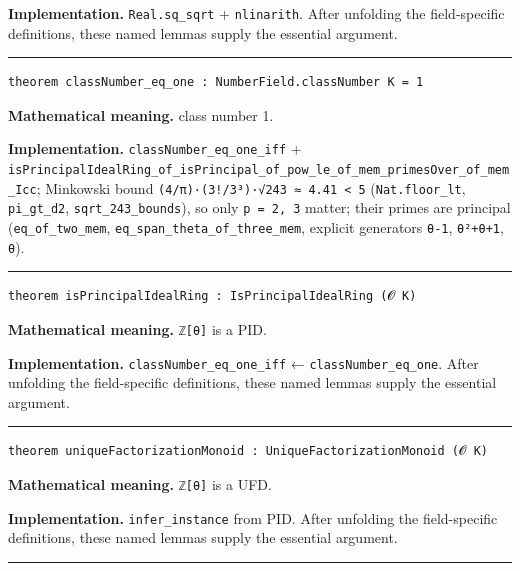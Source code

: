 \documentclass[UTF8,a4paper,11pt,fontset=fandol]{ctexart}
\theoremstyle{definition}
\newcommand{\statementsep}{\par\medskip\hrule\medskip}
\begin{document}
\noindent\textbf{Implementation.} \texttt{Real.\allowbreak{}sq\_\allowbreak{}sqrt} + \texttt{nlinarith}. After unfolding the field-specific definitions, these named lemmas supply the essential argument.\par
\statementsep
\begin{verbatim}
theorem classNumber_eq_one : NumberField.classNumber K = 1
\end{verbatim}
\noindent\textbf{Mathematical meaning.} class number 1.\par
\noindent\textbf{Implementation.} \texttt{classNumber\_\allowbreak{}eq\_\allowbreak{}one\_\allowbreak{}iff} + \texttt{isPrincipalIdealRing\_\allowbreak{}of\_\allowbreak{}isPrincipal\_\allowbreak{}of\_\allowbreak{}pow\_\allowbreak{}le\_\allowbreak{}of\_\allowbreak{}mem\_\allowbreak{}primesOver\_\allowbreak{}of\_\allowbreak{}mem\_\allowbreak{}Icc}; Minkowski bound \texttt{(4/\allowbreak{}π)·(3!/\allowbreak{}3³)·√243 ≈ 4.\allowbreak{}41 < 5} (\texttt{Nat.\allowbreak{}floor\_\allowbreak{}lt}, \texttt{pi\_\allowbreak{}gt\_\allowbreak{}d2}, \texttt{sqrt\_\allowbreak{}243\_\allowbreak{}bounds}), so only \texttt{p = 2, 3} matter; their primes are principal (\texttt{eq\_\allowbreak{}of\_\allowbreak{}two\_\allowbreak{}mem}, \texttt{eq\_\allowbreak{}span\_\allowbreak{}theta\_\allowbreak{}of\_\allowbreak{}three\_\allowbreak{}mem}, explicit generators \texttt{θ-1}, \texttt{θ²+θ+1}, \texttt{θ}).\par
\statementsep
\begin{verbatim}
theorem isPrincipalIdealRing : IsPrincipalIdealRing (𝓞 K)
\end{verbatim}
\noindent\textbf{Mathematical meaning.} \texttt{ℤ[θ]} is a PID.\par
\noindent\textbf{Implementation.} \texttt{classNumber\_\allowbreak{}eq\_\allowbreak{}one\_\allowbreak{}iff} ← \texttt{classNumber\_\allowbreak{}eq\_\allowbreak{}one}. After unfolding the field-specific definitions, these named lemmas supply the essential argument.\par
\statementsep
\begin{verbatim}
theorem uniqueFactorizationMonoid : UniqueFactorizationMonoid (𝓞 K)
\end{verbatim}
\noindent\textbf{Mathematical meaning.} \texttt{ℤ[θ]} is a UFD.\par
\noindent\textbf{Implementation.} \texttt{infer\_\allowbreak{}instance} from PID. After unfolding the field-specific definitions, these named lemmas supply the essential argument.\par
\statementsep
\end{document}

